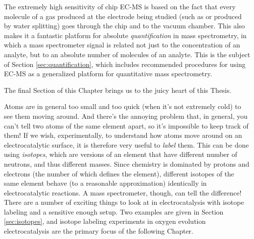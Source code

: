 The extremely high sensitivity of chip EC-MS is based on the fact that every molecule of a gas produced at the electrode being studied (such as  or  produced by water splitting) goes through the chip and to the vacuum chamber. This also makes it a fantastic platform for absolute \textit{quantification} in mass spectrometry, in which a mass spectrometer signal is related not just to the concentration of an analyte, but to an absolute number of molecules of an analyte. This is the subject of Section \ref{sec:quantification}, which includes recommended procedures for using EC-MS as a generalized platform for quantitative mass spectrometry.

The final Section of this Chapter brings us to the juicy heart of this Thesis. 

Atoms are in general too small and too quick (when it's not extremely cold) to see them moving around. And there's the annoying problem that, in general, you can't tell two atoms of the same element apart, so it's impossible to keep track of them! If we wish, experimentally, to understand how atoms move around on an electrocatalytic surface, it is therefore very useful to \textit{label} them. This can be done using \textit{isotopes}, which are versions of an element that have different number of neutrons, and thus different masses. Since chemistry is dominated by protons and electrons (the number of which defines the element), different isotopes of the same element behave (to a reasonable approximation) identically in electrocatalytic reactions. A mass spectrometer, though, can tell the difference! There are a number of exciting things to look at in electrocatalysis with isotope labeling and a sensitive enough setup. Two examples are given in Section \ref{sec:isotopes}, and isotope labeling experiments in oxygen evolution electrocatalysis are the primary focus of the following Chapter.

